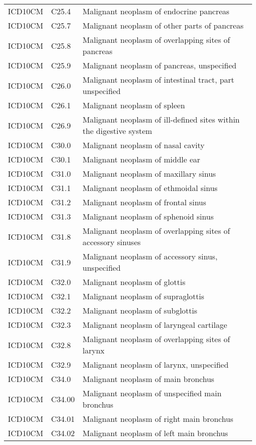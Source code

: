 \begin{longtable}{p{}p{}p{}}
  ICD10CM & C25.4 & Malignant neoplasm of endocrine pancreas \\ 
  ICD10CM & C25.7 & Malignant neoplasm of other parts of pancreas \\ 
  ICD10CM & C25.8 & Malignant neoplasm of overlapping sites of pancreas \\ 
  ICD10CM & C25.9 & Malignant neoplasm of pancreas, unspecified \\ 
  ICD10CM & C26.0 & Malignant neoplasm of intestinal tract, part unspecified \\ 
  ICD10CM & C26.1 & Malignant neoplasm of spleen \\ 
  ICD10CM & C26.9 & Malignant neoplasm of ill-defined sites within the digestive system \\ 
  ICD10CM & C30.0 & Malignant neoplasm of nasal cavity \\ 
  ICD10CM & C30.1 & Malignant neoplasm of middle ear \\ 
  ICD10CM & C31.0 & Malignant neoplasm of maxillary sinus \\ 
  ICD10CM & C31.1 & Malignant neoplasm of ethmoidal sinus \\ 
  ICD10CM & C31.2 & Malignant neoplasm of frontal sinus \\ 
  ICD10CM & C31.3 & Malignant neoplasm of sphenoid sinus \\ 
  ICD10CM & C31.8 & Malignant neoplasm of overlapping sites of accessory sinuses \\ 
  ICD10CM & C31.9 & Malignant neoplasm of accessory sinus, unspecified \\ 
  ICD10CM & C32.0 & Malignant neoplasm of glottis \\ 
  ICD10CM & C32.1 & Malignant neoplasm of supraglottis \\ 
  ICD10CM & C32.2 & Malignant neoplasm of subglottis \\ 
  ICD10CM & C32.3 & Malignant neoplasm of laryngeal cartilage \\ 
  ICD10CM & C32.8 & Malignant neoplasm of overlapping sites of larynx \\ 
  ICD10CM & C32.9 & Malignant neoplasm of larynx, unspecified \\ 
  ICD10CM & C34.0 & Malignant neoplasm of main bronchus \\ 
  ICD10CM & C34.00 & Malignant neoplasm of unspecified main bronchus \\ 
  ICD10CM & C34.01 & Malignant neoplasm of right main bronchus \\ 
  ICD10CM & C34.02 & Malignant neoplasm of left main bronchus \\ 

\end{longtable}
